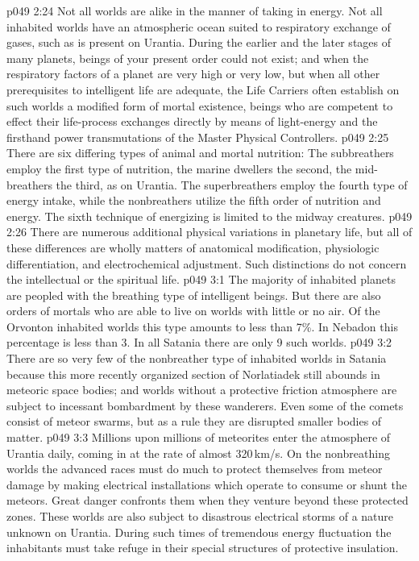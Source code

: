 \vs p049 2:24 \bibnobreakspace {} Not all worlds are alike in the manner of taking in energy. Not all inhabited worlds have an atmospheric ocean suited to respiratory exchange of gases, such as is present on Urantia. During the earlier and the later stages of many planets, beings of your present order could not exist; and when the respiratory factors of a planet are very high or very low, but when all other prerequisites to intelligent life are adequate, the Life Carriers often establish on such worlds a modified form of mortal existence, beings who are competent to effect their life\hyp{}process exchanges directly by means of light\hyp{}energy and the firsthand power transmutations of the Master Physical Controllers.
\vs p049 2:25 There are six differing types of animal and mortal nutrition: The subbreathers employ the first type of nutrition, the marine dwellers the second, the mid\hyp{}breathers the third, as on Urantia. The superbreathers employ the fourth type of energy intake, while the nonbreathers utilize the fifth order of nutrition and energy. The sixth technique of energizing is limited to the midway creatures.
\vs p049 2:26 \bibnobreakspace {} There are numerous additional physical variations in planetary life, but all of these differences are wholly matters of anatomical modification, physiologic differentiation, and electrochemical adjustment. Such distinctions do not concern the intellectual or the spiritual life.
\vs p049 3:1 The majority of inhabited planets are peopled with the breathing type of intelligent beings. But there are also orders of mortals who are able to live on worlds with little or no air. Of the Orvonton inhabited worlds this type amounts to less than 7\%. In Nebadon this percentage is less than 3. In all Satania there are only 9 such worlds.
\vs p049 3:2 There are so very few of the nonbreather type of inhabited worlds in Satania because this more recently organized section of Norlatiadek still abounds in meteoric space bodies; and worlds without a protective friction atmosphere are subject to incessant bombardment by these wanderers. Even some of the comets consist of meteor swarms, but as a rule they are disrupted smaller bodies of matter.
\vs p049 3:3 Millions upon millions of meteorites enter the atmosphere of Urantia daily, coming in at the rate of almost 320\,km/s. On the nonbreathing worlds the advanced races must do much to protect themselves from meteor damage by making electrical installations which operate to consume or shunt the meteors. Great danger confronts them when they venture beyond these protected zones. These worlds are also subject to disastrous electrical storms of a nature unknown on Urantia. During such times of tremendous energy fluctuation the inhabitants must take refuge in their special structures of protective insulation.
